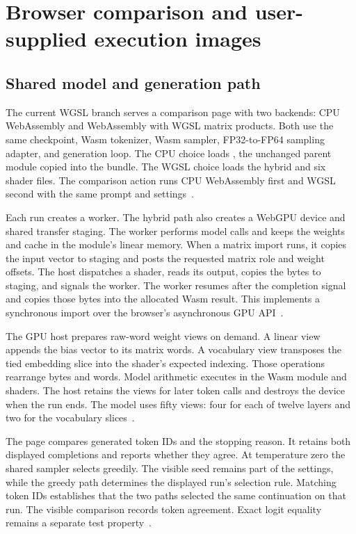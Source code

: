 \section{Browser comparison and user-supplied execution images}
\label{sec:browser}

\subsection{Shared model and generation path}

The current WGSL branch serves a comparison page with two backends: CPU WebAssembly and WebAssembly with WGSL matrix products.  Both use the same checkpoint, Wasm tokenizer, Wasm sampler, FP32-to-FP64 sampling adapter, and generation loop.  The CPU choice loads , the unchanged parent module copied into the bundle.  The WGSL choice loads the hybrid  and six shader files.  The comparison action runs CPU WebAssembly first and WGSL second with the same prompt and settings~\cite{browser-source,wg-packedguide}.

Each run creates a worker.  The hybrid path also creates a WebGPU device and shared transfer staging.  The worker performs model calls and keeps the weights and cache in the module's linear memory.  When a matrix import runs, it copies the input vector to staging and posts the requested matrix role and weight offsets.  The host dispatches a shader, reads its output, copies the bytes to staging, and signals the worker.  The worker resumes after the completion signal and copies those bytes into the allocated Wasm result.  This implements a synchronous import over the browser's asynchronous GPU API~\cite{browser-source}.

The GPU host prepares raw-word weight views on demand.  A linear view appends the bias vector to its matrix words.  A vocabulary view transposes the tied embedding slice into the shader's expected indexing.  Those operations rearrange bytes and words.  Model arithmetic executes in the Wasm module and shaders.  The host retains the views for later token calls and destroys the device when the run ends.  The model uses fifty views: four for each of twelve layers and two for the vocabulary slices~\cite{browser-source,wg-packedsource}.

The page compares generated token IDs and the stopping reason.  It retains both displayed completions and reports whether they agree.  At temperature zero the shared sampler selects greedily.  The visible seed remains part of the settings, while the greedy path determines the displayed run's selection rule.  Matching token IDs establishes that the two paths selected the same continuation on that run.  The visible comparison records token agreement.  Exact logit equality remains a separate test property~\cite{browser-source,wg-packedguide}.

